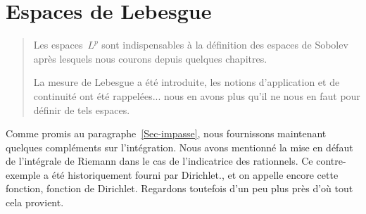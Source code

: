 \chapter{Espaces de Lebesgue}\label{Ch-Lp}
\begin{abstract}
Les espaces~$L^p$ sont indispensables à la définition des espaces de Sobolev après lesquels nous courons depuis quelques chapitres.

La mesure de Lebesgue a été introduite, les notions d'application et de continuité ont été rappelées... nous en avons plus qu'il ne nous en faut pour définir de tels espaces.
\end{abstract}
Comme promis au paragraphe~\ref{Sec-impasse}, nous fournissons maintenant quelques compléments sur l'intégration. Nous avons mentionné la mise en défaut de l'intégrale de Riemann dans le cas de l'indicatrice des rationnels.
Ce contre-exemple a été historiquement fourni par Dirichlet., et on appelle encore cette fonction, fonction de Dirichlet.
Regardons toutefois d'un peu plus près d'où tout cela provient.

